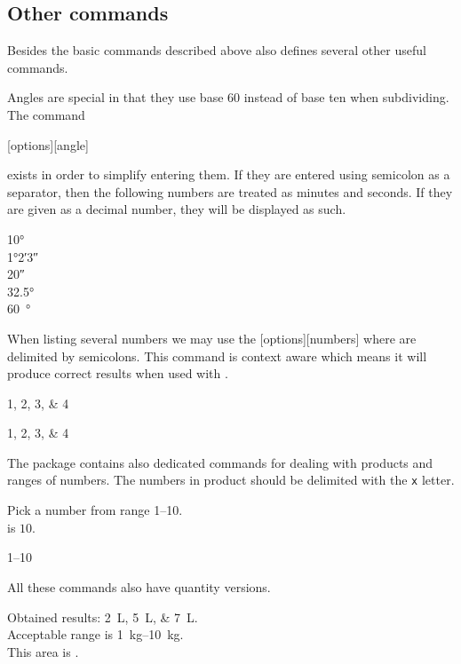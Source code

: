\subsection{Other  commands} \label{sec:arraymat}

Besides the basic commands described above  also defines several
other useful commands.

Angles are special in that they use base $60$ instead of base ten when
subdividing. The command
\begin{lscommand}
  [options][angle]
\end{lscommand}
exists in order to simplify entering them. If they are entered using semicolon
as a separator, then the following numbers are treated as minutes and seconds.
If they are given as a decimal number, they will be displayed as such.
\begin{example}
\ang{10} \\
\ang{1;2;3} \\
\ang{;;20} \\
\ang{32.5} \\
\qty{60}{\degree}
\end{example}

When listing several numbers we may use the [options][numbers]
where  are delimited by semicolons. This command is context aware
which means it will produce correct results when used with .
\begin{example}
\numlist{1;2;3;4}

\begin{german}
  \numlist{1;2;3;4}
\end{german}
\end{example}

The package contains also dedicated commands for dealing with products and
ranges of numbers. The numbers in product should be delimited with the \verb|x|
letter.
\begin{example}
Pick a number from
range \numrange{1}{10}. \\
 is $10$. \\
\begin{german}
  \numrange{1}{10}
\end{german}
\end{example}

All these commands also have quantity versions.
\begin{example}
Obtained results:
\qtylist{2;5;7}{\L}.\\
Acceptable range is
\qtyrange{1}{10}{\kg}. \\
This area is
.
\end{example}

